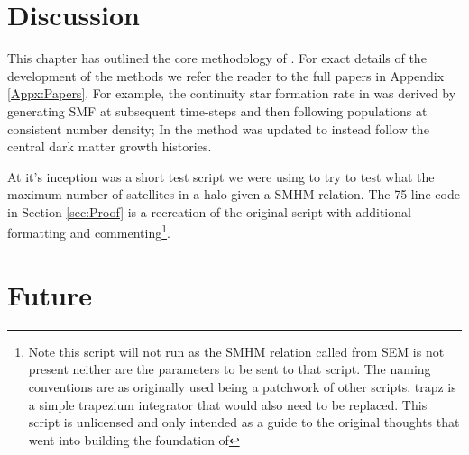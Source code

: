 \section{Discussion}

This chapter has outlined the core methodology of \steel. For exact details of the development of the methods we refer the reader to the full papers in Appendix \ref{Appx:Papers}. For example, the continuity star formation rate in  was derived by generating SMF at subsequent time-steps and then following populations at consistent number density; In  the method was updated to instead follow the central dark matter growth histories. 

At it's inception \steel was a short test script we were using to try to test what the maximum number of satellites in a halo given a SMHM relation. The 75 line code in Section \ref{sec:Proof} is a recreation of the original script with additional formatting and commenting\footnote{Note this script will not run as the SMHM relation called from SEM is not present neither are the parameters to be sent to that script. The naming conventions are as originally used being a patchwork of other scripts. trapz is a simple trapezium integrator that would also need to be replaced. This script is unlicensed and only intended as a guide to the original thoughts that went into building the foundation of \steel}.

\section{Future}

